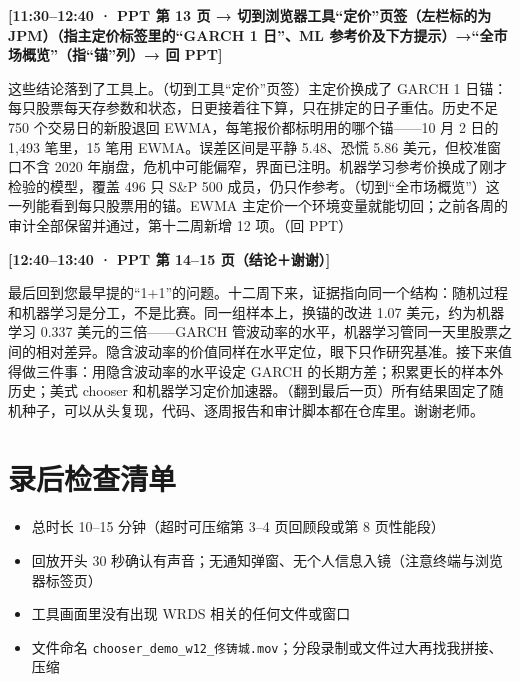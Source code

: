 \documentclass[11pt]{ctexart}
\newcommand{\cue}[1]{\noindent\colorbox{gray!15}{\parbox{\dimexpr\linewidth-2\fboxsep}{\textbf{#1}}}\par\smallskip}
\begin{document}
\cue{[11:30--12:40 · PPT 第 13 页 → 切到浏览器工具“定价”页签（左栏标的为 JPM）（指主定价标签里的“GARCH 1 日”、ML 参考价及下方提示）→“全市场概览”（指“锚”列）→ 回 PPT]}
这些结论落到了工具上。（切到工具“定价”页签）主定价换成了 GARCH 1 日锚：每只股票每天存参数和状态，日更接着往下算，只在排定的日子重估。历史不足 750 个交易日的新股退回 EWMA，每笔报价都标明用的哪个锚——10 月 2 日的 1,493 笔里，15 笔用 EWMA。误差区间是平静 5.48、恐慌 5.86 美元，但校准窗口不含 2020 年崩盘，危机中可能偏窄，界面已注明。机器学习参考价换成了刚才检验的模型，覆盖 496 只 S\&P 500 成员，仍只作参考。（切到“全市场概览”）这一列能看到每只股票用的锚。EWMA 主定价一个环境变量就能切回；之前各周的审计全部保留并通过，第十二周新增 12 项。（回 PPT）

\cue{[12:40--13:40 · PPT 第 14--15 页（结论＋谢谢）]}
最后回到您最早提的“1+1”的问题。十二周下来，证据指向同一个结构：随机过程和机器学习是分工，不是比赛。同一组样本上，换锚的改进 1.07 美元，约为机器学习 0.337 美元的三倍——GARCH 管波动率的水平，机器学习管同一天里股票之间的相对差异。隐含波动率的价值同样在水平定位，眼下只作研究基准。接下来值得做三件事：用隐含波动率的水平设定 GARCH 的长期方差；积累更长的样本外历史；美式 chooser 和机器学习定价加速器。（翻到最后一页）所有结果固定了随机种子，可以从头复现，代码、逐周报告和审计脚本都在仓库里。谢谢老师。

\section*{录后检查清单}
\begin{itemize}
  \item[$\square$] 总时长 10--15 分钟（超时可压缩第 3--4 页回顾段或第 8 页性能段）
  \item[$\square$] 回放开头 30 秒确认有声音；无通知弹窗、无个人信息入镜（注意终端与浏览器标签页）
  \item[$\square$] 工具画面里没有出现 WRDS 相关的任何文件或窗口
  \item[$\square$] 文件命名 \texttt{chooser\_demo\_w12\_佟铸城.mov}；分段录制或文件过大再找我拼接、压缩
\end{itemize}
\end{document}
